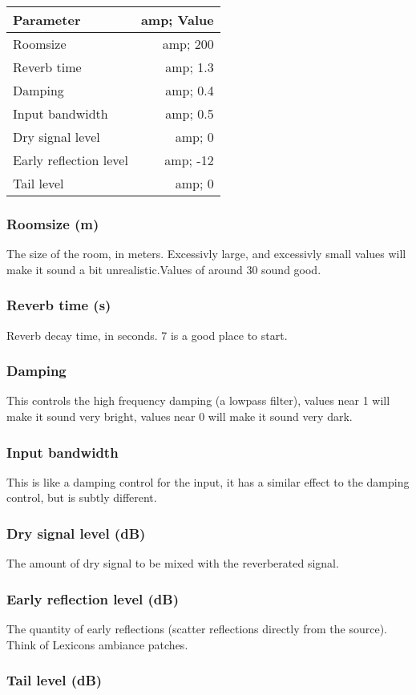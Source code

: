 \documentclass[11pt]{article}
\begin{document}
	\begin{tabular}{|l|r|}
	\hline
	Parameter &amp; Value \\
	\hline
	Roomsize &amp; 200 \\
	Reverb time &amp; 1.3 \\
	Damping &amp; 0.4 \\
	Input bandwidth &amp; 0.5 \\
	Dry signal level &amp; 0 \\
	Early reflection level &amp; -12 \\
	Tail level &amp; 0 \\
	\hline
	\end{tabular}
    \subsubsection*{Roomsize (m)}
The size of the room, in meters. Excessivly large, and excessivly small values will make it sound a bit unrealistic.Values of around 30 sound good.\subsubsection*{Reverb time (s)}
Reverb decay time, in seconds. 7 is a good place to start.\subsubsection*{Damping}
This controls the high frequency damping (a lowpass filter), values near 1 will make it sound very bright, values near 0 will make it sound very dark.\subsubsection*{Input bandwidth}
This is like a damping control for the input, it has a similar effect to the damping control, but is subtly different.\subsubsection*{Dry signal level (dB)}
The amount of dry signal to be mixed with the reverberated signal.\subsubsection*{Early reflection level (dB)}
The quantity of early reflections (scatter reflections directly from the source). Think of Lexicons ambiance patches.\subsubsection*{Tail level (dB)}
\end{document}
